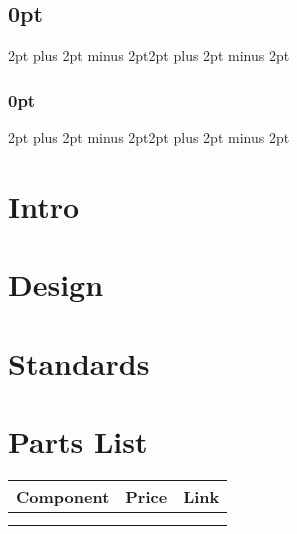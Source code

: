 \documentclass[10pt]{article}
\begin{document}
\setlength{\fboxrule}{.5mm}\setlength{\fboxsep}{1.2mm}
\newlength{\boxlength}\setlength{\boxlength}{\textwidth}
\addtolength{\boxlength}{-4mm}
\begin{center}
\end{center}

\titlespacing\subsection{0pt}{2pt plus 2pt minus 2pt}{2pt plus 2pt minus 2pt}
\titlespacing\subsubsection{0pt}{2pt plus 2pt minus 2pt}{2pt plus 2pt minus 2pt}

\section{Intro}

\section{Design}

\section{Standards}

\section{Parts List}

\begin{tabular}{lll}
\hline
Component & Price & Link\\
\hline
 &  & \\
 &  & \\
\end{tabular}
\begin{comment}
  #+ORGTBL: SEND component-table orgtbl-to-latex
  |-----------+-------+------|
  | Component | Price | Link |
  |-----------+-------+------|
  |           |       |      |
  |           |       |      |
\end{comment}
\end{document}
